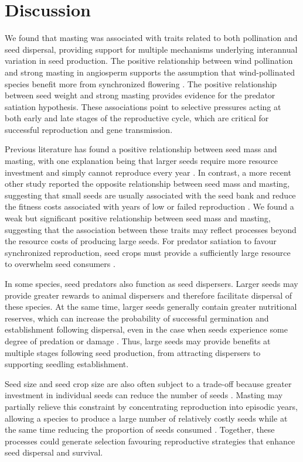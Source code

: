\documentclass{article}
\begin{document}
\section{Discussion}
We found that masting was associated with traits related to both pollination and seed dispersal, providing support for multiple mechanisms underlying interannual variation in seed production. The positive relationship between wind pollination and strong masting in angiosperm supports the assumption that wind-pollinated species benefit more from synchronized flowering \citep{pearse2015pollen}. The positive relationship between seed weight and strong masting provides evidence for the predator satiation hypothesis. These associations point to selective pressures acting at both early and late stages of the reproductive cycle, which are critical for successful reproduction and gene transmission.

Previous literature has found a positive relationship between seed mass and masting, with one explanation being that larger seeds require more resource investment and simply cannot reproduce every year \citep{kelly1994evolutionary}. In contrast, a more recent other study reported the opposite relationship between seed mass and masting, suggesting that small seeds are usually associated with the seed bank and reduce the fitness costs associated with years of low or failed reproduction \citep{journe2023evolution}. We found a weak but significant positive relationship between seed mass and masting, suggesting that the association between these traits may reflect processes beyond the resource costs of producing large seeds. For predator satiation to favour synchronized reproduction, seed crops must provide a sufficiently large resource to overwhelm seed consumers \citep{janzen1971seed,kelly1994evolutionary}. 

In some species, seed predators also function as seed dispersers. Larger seeds may provide greater rewards to animal dispersers and therefore facilitate dispersal of these species. At the same time, larger seeds generally contain greater nutritional reserves, which can increase the probability of successful germination and establishment following dispersal, even in the case when seeds experience some degree of predation or damage \citep{bonal2007satiation, moles2004seedling}. Thus, large seeds may provide benefits at multiple stages following seed production, from attracting dispersers to supporting seedling establishment.

Seed size and seed crop size are also often subject to a trade-off because greater investment in individual seeds can reduce the number of seeds \citep{castro2024seed, parciak2002seed}. Masting may partially relieve this constraint by concentrating reproduction into episodic years, allowing a species to produce a large number of relatively costly seeds while at the same time reducing the proportion of seeds consumed \citep{jansen2004seed, bonal2007satiation}. Together, these processes could generate selection favouring reproductive strategies that enhance seed dispersal and survival.
\end{document}
